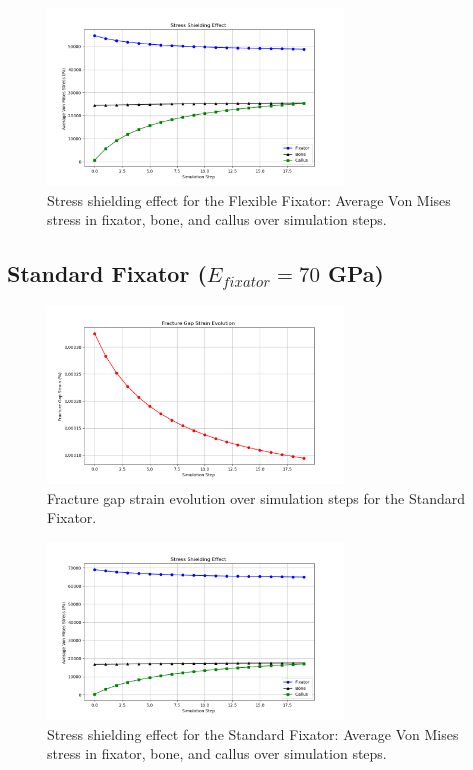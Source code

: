 \documentclass{article}
\begin{document}
\begin{figure}[htbp]
  \centering
  \includegraphics[width=0.7\textwidth]{../output_advanced/Flexible/stress_shielding.png}
  \caption{Stress shielding effect for the Flexible Fixator: Average Von Mises stress in fixator, bone, and callus over simulation steps.}
  \label{fig:flexible_stress_shielding}
\end{figure}

\clearpage %

\subsection{Standard Fixator (\texorpdfstring{$E_{fixator} = 70$}{E\_fixator = 70} GPa)}

\begin{figure}[htbp]
  \centering
  \includegraphics[width=0.7\textwidth]{../output_advanced/Standard/gap_strain.png}
  \caption{Fracture gap strain evolution over simulation steps for the Standard Fixator.}
  \label{fig:standard_gap_strain}
\end{figure}

\begin{figure}[htbp]
  \centering
  \includegraphics[width=0.7\textwidth]{../output_advanced/Standard/stress_shielding.png}
  \caption{Stress shielding effect for the Standard Fixator: Average Von Mises stress in fixator, bone, and callus over simulation steps.}
  \label{fig:standard_stress_shielding}
\end{figure}
\end{document}
